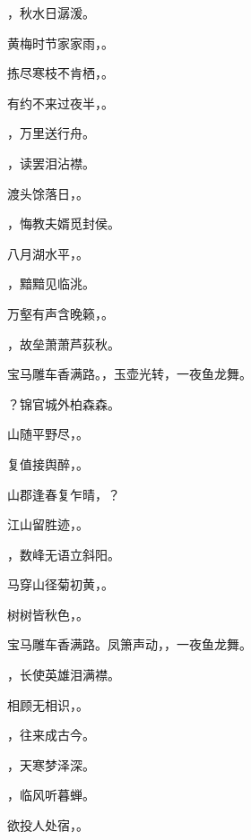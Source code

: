 \documentclass[12pt, a4paper, addpoints]{exam}
\begin{document}
\begin{questions}
\question[2] \uline{\qquad\qquad\qquad\qquad}，秋水日潺湲。

\question[2] 黄梅时节家家雨，\uline{\qquad\qquad\qquad\qquad}。

\question[2] 拣尽寒枝不肯栖，\uline{\qquad\qquad\qquad\qquad}。

\question[2] 有约不来过夜半，\uline{\qquad\qquad\qquad\qquad}。

\question[2] \uline{\qquad\qquad\qquad\qquad}，万里送行舟。

\question[2] \uline{\qquad\qquad\qquad\qquad}，读罢泪沾襟。

\question[2] 渡头馀落日，\uline{\qquad\qquad\qquad\qquad}。

\question[2] \uline{\qquad\qquad\qquad\qquad}，悔教夫婿觅封侯。

\question[2] 八月湖水平，\uline{\qquad\qquad\qquad\qquad}。

\question[2] \uline{\qquad\qquad\qquad\qquad}，黯黯见临洮。

\question[2] 万壑有声含晚籁，\uline{\qquad\qquad\qquad\qquad}。

\question[2] \uline{\qquad\qquad\qquad\qquad}，故垒萧萧芦荻秋。

\question[2] 宝马雕车香满路。\uline{\qquad\qquad\qquad\qquad}，玉壶光转，一夜鱼龙舞。

\question[2] \uline{\qquad\qquad\qquad\qquad}？锦官城外柏森森。

\question[2] 山随平野尽，\uline{\qquad\qquad\qquad\qquad}。

\question[2] 复值接舆醉，\uline{\qquad\qquad\qquad\qquad}。

\question[2] 山郡逢春复乍晴，\uline{\qquad\qquad\qquad\qquad}？

\question[2] 江山留胜迹，\uline{\qquad\qquad\qquad\qquad}。

\question[2] \uline{\qquad\qquad\qquad\qquad}，数峰无语立斜阳。

\question[2] 马穿山径菊初黄，\uline{\qquad\qquad\qquad\qquad}。

\question[2] 树树皆秋色，\uline{\qquad\qquad\qquad\qquad}。

\question[2] 宝马雕车香满路。凤箫声动，\uline{\qquad\qquad\qquad\qquad}，一夜鱼龙舞。

\question[2] \uline{\qquad\qquad\qquad\qquad}，长使英雄泪满襟。

\question[2] 相顾无相识，\uline{\qquad\qquad\qquad\qquad}。

\question[2] \uline{\qquad\qquad\qquad\qquad}，往来成古今。

\question[2] \uline{\qquad\qquad\qquad\qquad}，天寒梦泽深。

\question[2] \uline{\qquad\qquad\qquad\qquad}，临风听暮蝉。

\question[2] 欲投人处宿，\uline{\qquad\qquad\qquad\qquad}。

\end{questions}
\end{document}
